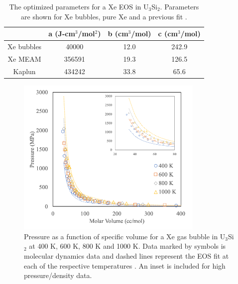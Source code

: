 \documentclass[review]{elsarticle}
\providecommand{\DIFaddtex}[1]{{\protect\color{blue} \sf #1}} %
\providecommand{\DIFaddFL}[1]{\DIFadd{#1}} %
\providecommand{\DIFaddbeginFL}{} %
\providecommand{\DIFaddendFL}{} %
\providecommand{\DIFadd}[1]{\texorpdfstring{\DIFaddtex{#1}}{#1}} %
\newcommand{\DIFaddincludegraphics}[2][]{{\color{blue}\fbox{\DIFOincludegraphics[#1]{#2}}}} %
\DeclareRobustCommand{\DIFaddbeginFL}{\DIFOaddbeginFL \let\includegraphics\DIFaddincludegraphics} %
\DeclareRobustCommand{\DIFaddendFL}{\DIFOaddendFL \let\includegraphics\DIFOincludegraphics} %
\begin{document}
\begin{table}[h]
\caption{The optimized parameters for a Xe EOS in U$_3$Si$_2$. Parameters are shown for Xe bubbles, pure Xe and a previous fit \cite{kaplun2003}.}\label{tab:eos}
\begin{center}
\begin{tabular}{|c|c|c|c|}
 \hline
  & a (J-cm$^3$/mol$^2$) & b (cm$^3$/mol) & c (cm$^3$/mol) \\ 
 \hline
 Xe bubbles & 40000 & 12.0 & 242.9 \\ 
 Xe MEAM & 356591 & 19.3 & 126.5 \\ 
 Kaplun \cite{kaplun2003} & 434242 & 33.8 & 65.6 \\ 
 \hline
\end{tabular}
\end{center}
\label{default}
\end{table}%


\begin{figure}[hbt]
	\centering
	\includegraphics[width=0.8\textwidth]{bubble_eosa.png}
 \caption{Pressure as a function of specific volume for a Xe gas bubble in U$_3$Si$_2$ at 400 K, 600 K, 800 K and 1000 K. Data marked by symbols is molecular dynamics data and dashed lines represent the EOS fit at each of the respective temperatures\DIFaddbeginFL \DIFaddFL{. An inset is included for high pressure/density data}\DIFaddendFL . }\label{fig:eos_sum}
\end{figure}

\FloatBarrier
\end{document}
